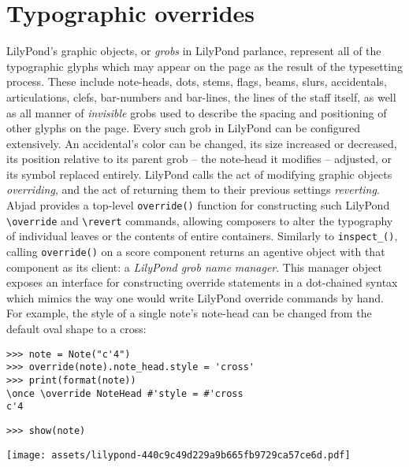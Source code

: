 \section{Typographic overrides}
\label{sec:typographic-overrides}

LilyPond's graphic objects, or \emph{grobs} in LilyPond parlance, represent all
of the typographic glyphs which may appear on the page as the result of the
typesetting process. These include note-heads, dots, stems, flags, beams,
slurs, accidentals, articulations, clefs, bar-numbers and bar-lines, the lines
of the staff itself, as well as all manner of \emph{invisible} grobs used
to describe the spacing and positioning of other glyphs on the page. Every such
grob in LilyPond can be configured extensively. An accidental's color can be
changed, its size increased or decreased, its position relative to its parent
grob -- the note-head it modifies -- adjusted, or its symbol replaced entirely.
LilyPond calls the act of modifying graphic objects \emph{overriding}, and the
act of returning them to their previous settings \emph{reverting}. Abjad
provides a top-level \texttt{override()} function for constructing such
LilyPond \texttt{\textbackslash{}override} and \texttt{\textbackslash{}revert}
commands, allowing composers to alter the typography of individual leaves or
the contents of entire containers. Similarly to \texttt{inspect\_()}, calling
\texttt{override()} on a score component returns an agentive object with that
component as its client: a \emph{LilyPond grob name manager}. This manager
object exposes an interface for constructing override statements in a
dot-chained syntax which mimics the way one would write LilyPond override
commands by hand. For example, the style of a single note's note-head can be
changed from the default oval shape to a cross:

\begin{comment}
<abjad>
note = Note("c'4")
override(note).note_head.style = 'cross'
print(format(note))
show(note)
</abjad>
\end{comment}

\begin{abjadbookoutput}
\begin{singlespacing}
\vspace{-0.5\baselineskip}
\begin{verbatim}
>>> note = Note("c'4")
>>> override(note).note_head.style = 'cross'
>>> print(format(note))
\once \override NoteHead #'style = #'cross
c'4
\end{verbatim}
\begin{verbatim}
>>> show(note)
\end{verbatim}
\noindent\texttt{[image: assets/lilypond-440c9c49d229a9b665fb9729ca57ce6d.pdf]}
\end{singlespacing}
\end{abjadbookoutput}


